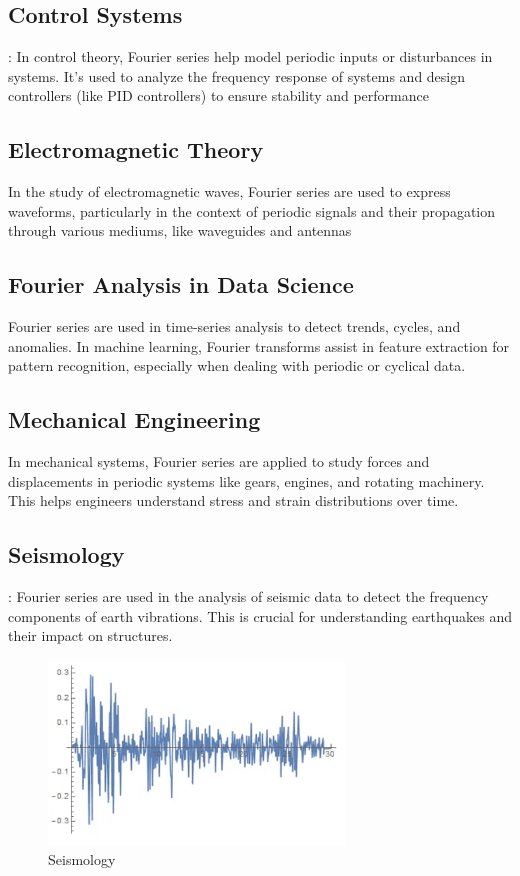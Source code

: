 \documentclass[12pt,a4paper]{article}
\begin{document}
\subsection{Control Systems}
: In control theory, Fourier series help model periodic inputs or disturbances in systems. It’s used to analyze the frequency response of systems and design controllers (like PID controllers) to ensure stability and performance

\subsection{Electromagnetic Theory}
In the study of electromagnetic waves, Fourier series are used to express waveforms, particularly in the context of periodic signals and their propagation through various mediums, like waveguides and antennas

\subsection{Fourier Analysis in Data Science}
Fourier series are used in time-series analysis to detect trends, cycles, and anomalies. In machine learning, Fourier transforms assist in feature extraction for pattern recognition, especially when dealing with periodic or cyclical data.

\subsection{ Mechanical Engineering}
In mechanical systems, Fourier series are applied to study forces and displacements in periodic systems like gears, engines, and rotating machinery. This helps engineers understand stress and strain distributions over time.

\subsection{Seismology}
: Fourier series are used in the analysis of seismic data to detect the frequency components of earth vibrations. This is crucial for understanding earthquakes and their impact on structures.
\begin{figure}[H]
    \centering
    \includegraphics[width=0.7\textwidth]{Seismology}
    \caption{Seismology}
\end{figure}
\end{document}
